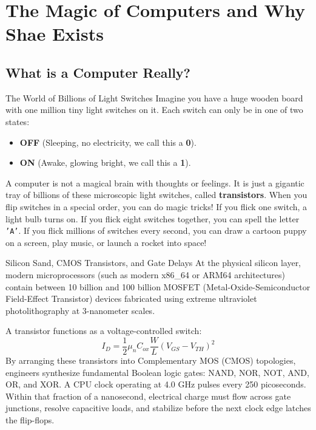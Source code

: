 \chapter{The Magic of Computers and Why Shae Exists}

\section{What is a Computer Really?}

\begin{kidbox}{The World of Billions of Light Switches}
Imagine you have a huge wooden board with one million tiny light switches on it. 
Each switch can only be in one of two states:
\begin{itemize}
    \item \textbf{OFF} (Sleeping, no electricity, we call this a \textbf{0}).
    \item \textbf{ON} (Awake, glowing bright, we call this a \textbf{1}).
\end{itemize}
A computer is not a magical brain with thoughts or feelings. It is just a gigantic tray of billions of these microscopic light switches, called \textbf{transistors}.
When you flip switches in a special order, you can do magic tricks! If you flick one switch, a light bulb turns on. If you flick eight switches together, you can spell the letter \texttt{'A'}. If you flick millions of switches every second, you can draw a cartoon puppy on a screen, play music, or launch a rocket into space!
\end{kidbox}

\begin{deepbox}{Silicon Sand, CMOS Transistors, and Gate Delays}
At the physical silicon layer, modern microprocessors (such as modern x86\_64 or ARM64 architectures) contain between 10 billion and 100 billion MOSFET (Metal-Oxide-Semiconductor Field-Effect Transistor) devices fabricated using extreme ultraviolet photolithography at 3-nanometer scales.

A transistor functions as a voltage-controlled switch:
\begin{equation}
I_D = \frac{1}{2} \mu_n C_{ox} \frac{W}{L} (V_{GS} - V_{TH})^2
\end{equation}
By arranging these transistors into Complementary MOS (CMOS) topologies, engineers synthesize fundamental Boolean logic gates: NAND, NOR, NOT, AND, OR, and XOR. 
A CPU clock operating at 4.0 GHz pulses every 250 picoseconds. Within that fraction of a nanosecond, electrical charge must flow across gate junctions, resolve capacitive loads, and stabilize before the next clock edge latches the flip-flops.
\end{deepbox}

